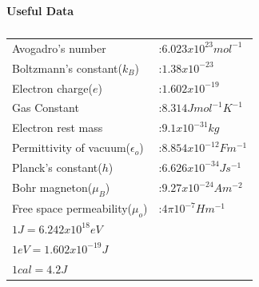 \documentclass[a4paper,10pt]{article}
\begin{document}
\begin{center}
    \textbf{Useful Data}
\end{center}
\begin{table}[H]
    \centering
    \begin{center}
    \begin{tabular}{|l l|}
        \hline
         Avogadro's number&:$6.023x10^{23}mol^{-1}$  \\
         Boltzmann's constant($k_B$)&:$1.38x10^{-23}$ \\
         Electron charge($e$)&:$1.602x10^{-19}$\\
         Gas Constant&:$8.314Jmol^{-1}K^{-1}$\\
         Electron rest mass&:$9.1x10^{-31}kg$\\
         Permittivity of vacuum($\epsilon_o$)&:$8.854x10^{-12}Fm^{-1}$\\
         Planck's constant($h$)&:$6.626x10^{-34}Js^{-1}$\\
         Bohr magneton($\mu_B$)&:$9.27x10^{-24}Am^{-2}$\\
         Free space permeability($\mu_o$)&:$4\pi 10^{-7}Hm^{-1}$\\
         $1J=6.242x10^{18}eV$&\\
         $1eV=1.602x10^{-19}J$&\\
         $1cal=4.2J$\\
         \hline
    \end{tabular}
\end{center}
    \caption*{}
    \label{useful_data}
\end{table}
\end{document}
